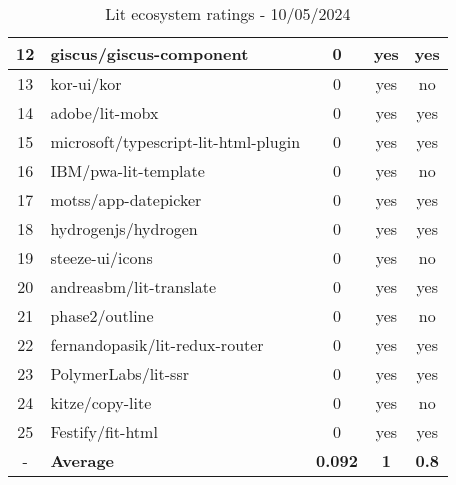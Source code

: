 \begin{table}[H]
{\begin{tabular}{|c|l|c|c|c|}
            12 & giscus/giscus-component                    & 0                  & yes                        & yes                \\ \hline
            13 & kor-ui/kor                                 & 0                  & yes                        & no                 \\ \hline
            14 & adobe/lit-mobx                             & 0                  & yes                        & yes                \\ \hline
            15 & microsoft/typescript-lit-html-plugin       & 0                  & yes                        & yes                \\ \hline
            16 & IBM/pwa-lit-template                       & 0                  & yes                        & no                 \\ \hline
            17 & motss/app-datepicker                       & 0                  & yes                        & yes                \\ \hline
            18 & hydrogenjs/hydrogen                        & 0                  & yes                        & yes                \\ \hline
            19 & steeze-ui/icons                            & 0                  & yes                        & no                 \\ \hline
            20 & andreasbm/lit-translate                    & 0                  & yes                        & yes                \\ \hline
            21 & phase2/outline                             & 0                  & yes                        & no                 \\ \hline
            22 & fernandopasik/lit-redux-router             & 0                  & yes                        & yes                \\ \hline
            23 & PolymerLabs/lit-ssr                        & 0                  & yes                        & yes                \\ \hline
            24 & kitze/copy-lite                            & 0                  & yes                        & no                 \\ \hline
            25 & Festify/fit-html                           & 0                  & yes                        & yes                \\ \hline
            -  & \textbf{Average}                           & \textbf{0.092}     & \textbf{1}                 & \textbf{0.8}       \\ \hline
        \end{tabular}
    }
    \caption{Lit ecosystem ratings - 10/05/2024}
    \label{tab:metrics:lit:ratings}
\end{table}

